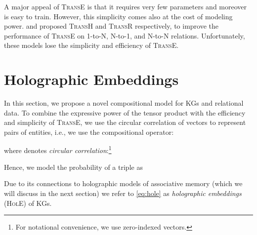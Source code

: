 \documentclass[letterpaper]{article}
\newcommand{\hole}{\textsc{HolE}\xspace}
\newcommand{\transe}{\textsc{TransE}\xspace}
\newcommand{\transr}{\textsc{TransR}\xspace}
\newcommand{\transh}{\textsc{TransH}\xspace}
\begin{document}
A major appeal of \transe is that it requires very few parameters and moreover is
easy to train. However, this simplicity comes also at the cost of modeling
power. \citet{wang2014knowledge} and \citet{lin2015learning}
proposed \transh and \transr respectively, to improve the performance of \transe
on 1-to-N, N-to-1, and N-to-N relations.
Unfortunately, these models lose the
simplicity and efficiency of \transe.




\section{Holographic Embeddings}

\label{sec:hole}
In this section, we propose a novel compositional model for KGs and relational data. 
To combine the expressive power of the tensor product with the
efficiency and simplicity of \transe, we use the circular correlation 
of vectors to represent pairs of entities, i.e., we use the compositional operator:

where  denotes
\emph{circular correlation}:\footnote{For notational convenience, we use
  zero-indexed vectors.}

Hence, we model the probability of a triple as

Due to its connections to holographic models of associative memory (which we
will discuss in the next section) we refer to \cref{eq:hole} as
\emph{holographic embeddings} (\hole) of KGs.
\end{document}
